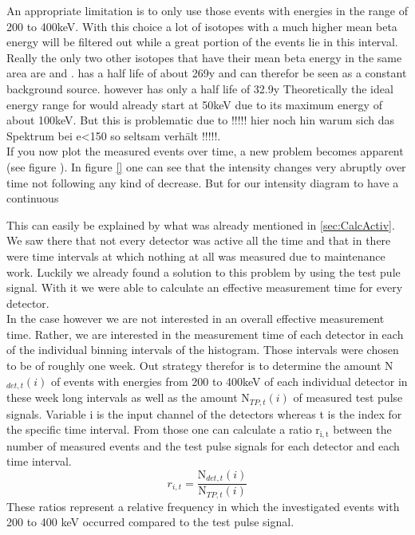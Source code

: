 An appropriate limitation is to only use those events with energies in the range of 200 to 400keV.
With this choice a lot of isotopes with a much higher mean beta energy will be filtered out while a great portion of the \Kr events lie in this interval.
Really the only two other isotopes that have their mean beta energy in the same area are  and .
 has a half life of about 269y and can therefor be seen as a constant background source.
 however has only a half life of 32.9y 
Theoretically the ideal energy range for \Kr would already start at 50keV due to its maximum energy of about 100keV.
But this is problematic due to  !!!!! hier noch hin warum sich das Spektrum bei e<150 so seltsam verhält !!!!!.
\\



If you now plot the measured events over time, a new problem becomes apparent (see figure ).
In figure \ref{} one can see that the intensity changes very abruptly over time not following any kind of decrease.
But for our intensity diagram to have a continuous


This can easily be explained by what was already mentioned in \ref{sec:CalcActiv}.
We saw there that not every detector was active all the time and that in \PII there were time intervals at which nothing at all was measured due to maintenance work.
Luckily we already found a solution to this problem by using the test pule signal.
With it we were able to calculate an effective measurement time for every detector.
\\

In the case however we are not interested in an overall effective measurement time.
Rather, we are interested in the measurement time of each detector in each of the individual binning intervals of the histogram.
Those intervals were chosen to be of roughly one week.
Out strategy therefor is to determine the amount N$_{det,t}(i)$ of events with energies from 200 to 400keV of each individual detector in these week long intervals as well as the amount N$_{TP,t}(i)$ of measured test pulse signals.
Variable i is the input channel of the detectors whereas t is the index for the specific time interval.
From those one can calculate a ratio r$_{\mathrm{i,t}}$ between the number of measured events and the test pulse signals for each detector and each time interval.
\begin{equation*}
r_{i,t} = \frac{\mathrm{N}_{det,t}(i)}{\mathrm{N}_{TP,t}(i)}
\end{equation*}  
These ratios represent a relative frequency in which the investigated events with 200 to 400 keV occurred compared to the test pulse signal.



